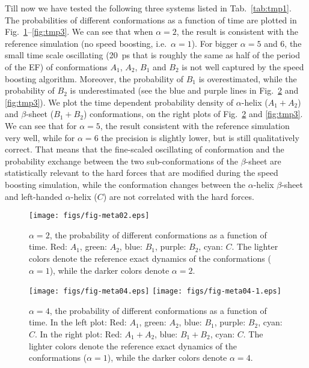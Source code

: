 \documentclass[aip,jcp,a4paper,reprint,onecolumn]{revtex4-1}
\begin{document}
\noindent
Till now we have tested the following three systems listed in
Tab.~\ref{tab:tmp1}. The probabilities of different conformations as a
function of time are plotted in Fig.~\ref{fig:tmp1}--\ref{fig:tmp3}.
We can see that when $\alpha = 2$, the result is consistent with the
reference simulation (no speed boosting, i.e.~$\alpha = 1$). For
bigger $\alpha = 5$ and 6, the small time scale oscillating (20~ps
that is roughly the same as half of the period of the EF) of
conformations $A_1$, $A_2$, $B_1$ and $B_2$ is not well captured by
the speed boosting algorithm. Moreover, the probability of $B_1$ is
overestimated, while the probability of $B_2$ is underestimated (see
the blue and purple lines in Fig.~\ref{fig:tmp2} and \ref{fig:tmp3}).
We plot the time dependent probability density of $\alpha$-helix
($A_1+A_2$) and $\beta$-sheet ($B_1+B_2$) conformations, on the right
plots of Fig.~\ref{fig:tmp2} and \ref{fig:tmp3}. We can see that for
$\alpha=5$, the result consistent with the reference simulation very
well, while for $\alpha=6$ the precision is slightly lower, but is
still qualitatively correct.  That means that the fine-scaled
oscillating of conformation and the probability exchange between the
two sub-conformations of the $\beta$-sheet are statistically relevant
to the hard forces that are modified during the speed boosting
simulation, while the conformation changes between the $\alpha$-helix
$\beta$-sheet and left-handed $\alpha$-helix ($C$)  are not correlated
with the hard forces.


\begin{figure}
  \centering
  \texttt{[image: figs/fig-meta02.eps]}
  \caption{$\alpha = 2$, the probability of different conformations as
    a function of time.  Red: $A_1$, green: $A_2$, blue: $B_1$,
    purple: $B_2$, cyan: $C$.  The lighter colors denote the reference
    exact dynamics of the conformations ($\alpha = 1$), while the
    darker colors denote $\alpha = 2$.}
  \label{fig:tmp1}
\end{figure}

\begin{figure}
  \centering
  \texttt{[image: figs/fig-meta04.eps]}
  \texttt{[image: figs/fig-meta04-1.eps]}
  \caption{$\alpha = 4$, the probability of different conformations as a function of time.
    In the left plot: Red: $A_1$, green: $A_2$, blue: $B_1$, purple: $B_2$, cyan: $C$.
    In the right plot: Red: $A_1+A_2$, blue: $B_1+B_2$, cyan: $C$.
    The lighter colors denote the reference exact dynamics of the conformations ($\alpha = 1$), while the darker colors denote $\alpha = 4$.}
  \label{fig:tmp2}
\end{figure}
\end{document}
